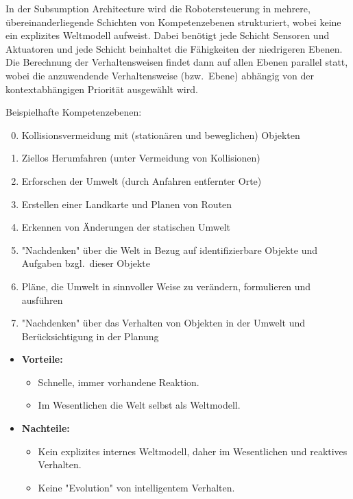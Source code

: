 \documentclass[a4paper, 11pt, accentcolor = tud3b]{tudreport}
\newcommand{\bzw}{bzw.~}
\newcommand{\bzgl}{bzgl.~}
\begin{document}
				In der Subsumption Architecture wird die Robotersteuerung in mehrere, übereinanderliegende Schichten von Kompetenzebenen strukturiert, wobei keine ein explizites Weltmodell aufweist. Dabei benötigt jede Schicht Sensoren und Aktuatoren und jede Schicht beinhaltet die Fähigkeiten der niedrigeren Ebenen. Die Berechnung der Verhaltensweisen findet dann auf allen Ebenen parallel statt, wobei die anzuwendende Verhaltensweise (\bzw Ebene) abhängig von der kontextabhängigen Priorität ausgewählt wird.
				
				Beispielhafte Kompetenzebenen:
				\begin{enumerate}
					\setcounter{enumi}{-1}
					\item Kollisionsvermeidung mit (stationären und beweglichen) Objekten
					\item Ziellos Herumfahren (unter Vermeidung von Kollisionen)
					\item Erforschen der Umwelt (durch Anfahren entfernter Orte)
					\item Erstellen einer Landkarte und Planen von Routen
					\item Erkennen von Änderungen der statischen Umwelt
					\item "Nachdenken" über die Welt in Bezug auf identifizierbare Objekte und Aufgaben \bzgl dieser Objekte
					\item Pläne, die Umwelt in sinnvoller Weise zu verändern, formulieren und ausführen
					\item "Nachdenken" über das Verhalten von Objekten in der Umwelt und Berücksichtigung in der Planung
				\end{enumerate}
			
				\begin{itemize}
					\item \textbf{Vorteile:}
						\begin{itemize}
							\item Schnelle, immer vorhandene Reaktion.
							\item Im Wesentlichen die Welt selbst als Weltmodell.
						\end{itemize}
					\item \textbf{Nachteile:}
						\begin{itemize}
							\item Kein explizites internes Weltmodell, daher im Wesentlichen und reaktives Verhalten.
							\item Keine "Evolution" von intelligentem Verhalten.
						\end{itemize}
				\end{itemize}
\end{document}
